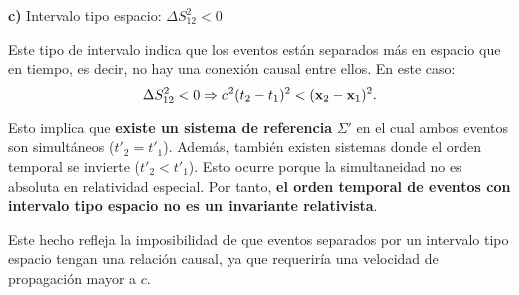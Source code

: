 \documentclass{article}
\begin{document}
\textbf{c)} Intervalo tipo espacio: $\Delta S_{12}^2 < 0$

Este tipo de intervalo indica que los eventos están separados más en espacio que en tiempo, es decir, no hay una conexión causal entre ellos. En este caso:
\[
\Delta S_{12}^2 < 0 \Rightarrow c^2(t_2 - t_1)^2 < (\vb{x}_2 - \vb{x}_1)^2.
\]

Esto implica que \textbf{existe un sistema de referencia} $\Sigma'$ en el cual ambos eventos son simultáneos ($t'_2 = t'_1$). Además, también existen sistemas donde el orden temporal se invierte ($t'_2 < t'_1$). Esto ocurre porque la simultaneidad no es absoluta en relatividad especial. Por tanto, \textbf{el orden temporal de eventos con intervalo tipo espacio no es un invariante relativista}.

Este hecho refleja la imposibilidad de que eventos separados por un intervalo tipo espacio tengan una relación causal, ya que requeriría una velocidad de propagación mayor a $c$.
\end{document}
